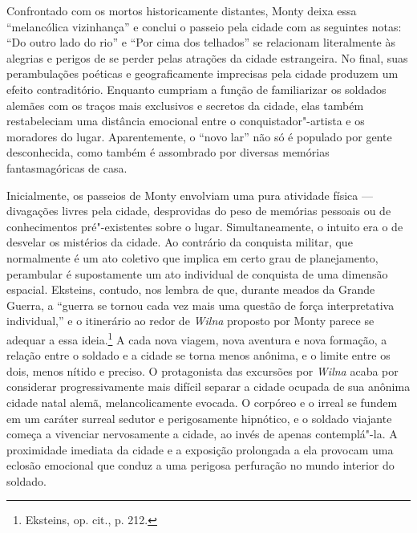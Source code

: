 %

Confrontado com os mortos historicamente distantes, Monty deixa essa
``melancólica vizinhança'' e conclui o passeio pela cidade com as
seguintes notas: ``Do outro lado do rio'' e ``Por cima dos telhados'' se
relacionam literalmente às alegrias e perigos de se perder pelas
atrações da cidade estrangeira. No final, suas perambulações poéticas e
geograficamente imprecisas pela cidade produzem um efeito contraditório.
Enquanto cumpriam a função de familiarizar os soldados alemães com os
traços mais exclusivos e secretos da cidade, elas também restabeleciam
uma distância emocional entre o conquistador"-artista e os moradores do
lugar. Aparentemente, o ``novo lar'' não só é populado por gente
desconhecida, como também é assombrado por diversas memórias
fantasmagóricas de casa.

Inicialmente, os passeios de Monty envolviam uma pura atividade física ---
divagações livres pela cidade, desprovidas do peso de memórias pessoais
ou de conhecimentos pré"-existentes sobre o lugar. Simultaneamente, o
intuito era o de desvelar os mistérios da cidade. Ao contrário da
conquista militar, que normalmente é um ato coletivo que implica em
certo grau de planejamento, perambular é supostamente um ato individual
de conquista de uma dimensão espacial. Eksteins, contudo, nos lembra de
que, durante meados da Grande Guerra, a ``guerra se tornou cada vez mais
uma questão de força interpretativa individual,'' e o itinerário ao
redor de \textit{Wilna} proposto por Monty parece se adequar a essa
ideia.\footnote{Eksteins, op. cit., p. 212.} A cada nova viagem, nova
aventura e nova formação, a relação entre o soldado e a cidade se torna
menos anônima, e o limite entre os dois, menos nítido e preciso. O
protagonista das excursões por \textit{Wilna} acaba por considerar
progressivamente mais difícil separar a cidade ocupada de sua anônima
cidade natal alemã, melancolicamente evocada. O corpóreo e o irreal se
fundem em um caráter surreal sedutor e perigosamente hipnótico, e o
soldado viajante começa a vivenciar nervosamente a cidade, ao invés de
apenas contemplá"-la. A proximidade imediata da cidade e a exposição
prolongada a ela provocam uma eclosão emocional que conduz a uma
perigosa perfuração no mundo interior do soldado.

